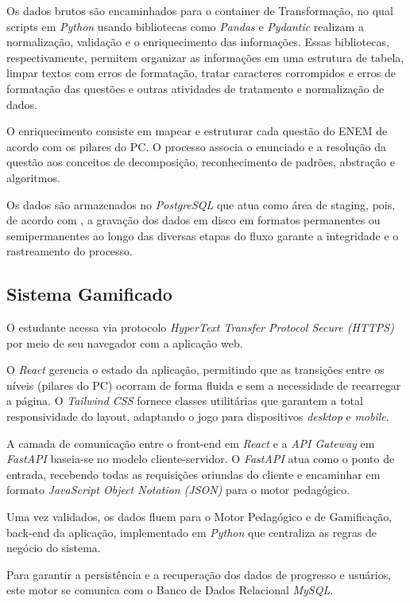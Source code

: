 Os dados brutos são encaminhados para o container de Transformação, no qual
scripts em \textit{Python} usando bibliotecas como \textit{Pandas} e
\textit{Pydantic} realizam a normalização, validação e o enriquecimento das
informações. Essas bibliotecas, respectivamente, permitem organizar as
informações em uma estrutura de tabela, limpar textos com erros de formatação,
tratar caracteres corrompidos e erros de formatação das questões e outras atividades 
de tratamento e normalização de dados.

O enriquecimento consiste em mapear e estruturar cada questão do ENEM de acordo
com os pilares do PC. O processo associa o enunciado e a resolução da questão
aos conceitos de decomposição, reconhecimento de padrões, abstração e
algoritmos.

Os dados são armazenados no \textit{PostgreSQL} que atua como área de staging,
pois, de acordo com \cite{kimball2004data}, a gravação dos dados em disco em
formatos permanentes ou semipermanentes ao longo das diversas etapas do fluxo
garante a integridade e o rastreamento do processo.

\subsection{Sistema Gamificado}
O estudante acessa via protocolo \textit{HyperText Transfer Protocol Secure (HTTPS)}
por meio de seu navegador com a aplicação web. 

O \textit{React} gerencia o estado da aplicação, permitindo que as transições
entre os níveis (pilares do PC) ocorram de forma fluida e sem a necessidade de
recarregar a página. O \textit{Tailwind CSS} fornece classes utilitárias que
garantem a total responsividade do layout, adaptando o jogo para
dispositivos \textit{desktop} e \textit{mobile}.

A camada de comunicação entre o front-end em \textit{React} e a \textit{API
Gateway} em \textit{FastAPI} baseia-se no modelo cliente-servidor. O
\textit{FastAPI} atua como o ponto de entrada, recebendo todas as requisições
oriundas do cliente e encaminhar em formato \textit{JavaScript Object Notation (JSON)} para o motor pedagógico.

Uma vez validados, os dados fluem para o Motor Pedagógico e de
Gamificação, back-end da aplicação, implementado em \textit{Python} que
centraliza as regras de negócio do sistema. 

Para garantir a persistência e a recuperação dos dados de progresso e usuários,
este motor se comunica com o Banco de Dados Relacional \textit{MySQL}.

